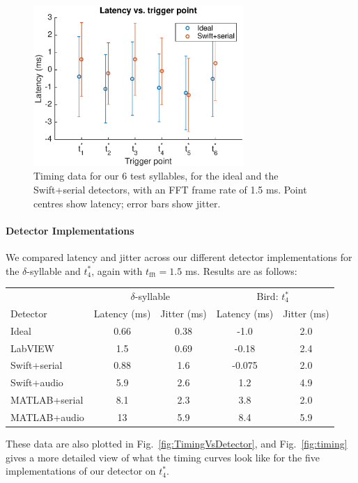 \documentclass[10pt,letterpaper]{article}
\newcommand\fig[1]{Fig.~\ref{#1}}
\renewcommand{\subsubsection}[1]{\paragraph{#1}}
\begin{document}
\begin{figure}
  \begin{center}
    \includegraphics[width=8cm]{Fig5}
  \end{center}
  \caption{Timing data for our 6 test syllables, for the ideal and the
    Swift+serial detectors, with an FFT frame rate of 1.5 ms.  Point
    centres show latency; error bars show jitter.}
  \label{fig:TimingVsSyllable}
\end{figure}



\subsubsection{Detector Implementations}


We compared latency and jitter across our different detector
implementations for the $\delta$-syllable and $t^*_4$, again with
$t_\mathrm{fft}=1.5$ ms.  Results are as follows:
\vspace{8pt}
\begin{tabular}{l|c|c|c| c}
  & \multicolumn{2}{c}{$\delta$-syllable} & \multicolumn{2}{c}{Bird: $t^*_4$} \\
  Detector & Latency (ms) & Jitter (ms) & Latency (ms) & Jitter (ms) \\
  \hline
  Ideal & 0.66 & 0.38 & -1.0 & 2.0 \\
  LabVIEW & 1.5 & 0.69 & -0.18 & 2.4 \\
  Swift+serial & 0.88 & 1.6 & -0.075 & 2.0 \\
  Swift+audio & 5.9 & 2.6 & 1.2 & 4.9 \\
  MATLAB+serial & 8.1 & 2.3 & 3.8 & 2.0 \\
  MATLAB+audio & 13 & 5.9 & 8.4 & 5.9
\end{tabular}
\vspace{8pt}\par\noindent
These data are also plotted in \fig{fig:TimingVsDetector}, and
\fig{fig:timing} gives a more detailed view of what the timing curves
look like for the five implementations of our detector on $t^*_4$.
\end{document}

